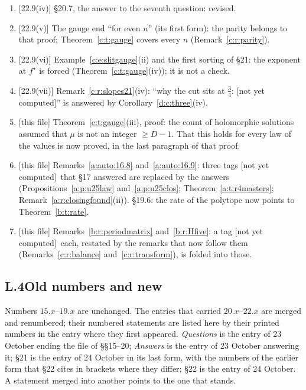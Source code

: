\documentclass[11pt]{article}
\theoremstyle{plain}
\theoremstyle{definition}
\theoremstyle{remark}
\newcommand{\notyet}{\textup{[not yet computed]}}
\begin{document}
\begin{enumerate}[label=\textbf{C\arabic*},ref=C\arabic*,leftmargin=*,itemsep=3pt]
\item {\small[22.9(iv)]} \S20.7, the answer to the seventh question: revised.
\item {\small[22.9(v)]} The gauge end ``for even $n$'' (its first form): the parity belongs to that proof; Theorem~\ref{c:t:gauge} covers every $n$ (Remark~\ref{c:r:parity}).
\item {\small[22.9(vi)]} Example~\ref{c:e:slitgauge}(ii) and the first sorting of \S21: the exponent at $f^\star$ is forced (Theorem~\ref{c:t:gauge}(iv)); it is not a check.
\item {\small[22.9(vii)]} Remark~\ref{c:r:slopes21}(iv): ``why the cut sits at $\frac34$: \notyet'' is answered by Corollary~\ref{d:c:three}(iv).
\item {\small[this file]} Theorem~\ref{c:t:gauge}(iii), proof: the count of holomorphic solutions assumed that $\mu$ is not an integer $\ge D-1$. That this holds for every law of the values is now proved, in the last paragraph of that proof.
\item {\small[this file]} Remarks~\ref{a:auto:16.8} and~\ref{a:auto:16.9}: three tags \notyet\ that \S17 answered are replaced by the answers (Propositions~\ref{a:p:u25law} and~\ref{a:p:u25clos}; Theorem~\ref{a:t:r4masters}; Remark~\ref{a:r:closingfound}(ii)). \S19.6: the rate of the polytope now points to Theorem~\ref{b:t:rate}.
\item {\small[this file]} Remarks~\ref{b:r:periodmatrix} and~\ref{b:r:Hfive}: a tag \notyet\ each, restated by the remarks that now follow them (Remarks~\ref{c:r:balance} and~\ref{c:r:transform}), is folded into those.
\end{enumerate}

\subsection*{L.4\quad Old numbers and new}

Numbers $15.x$--$19.x$ are unchanged. The entries that carried $20.x$--$22.x$ are merged and renumbered; their numbered statements are listed here by their printed numbers in the entry where they first appeared. \emph{Questions} is the entry of 23 October ending the file of \S\S15--20; \emph{Answers} is the entry of 23 October answering it; \S21 is the entry of 24 October in its last form, with the numbers of the earlier form that \S22 cites in brackets where they differ; \S22 is the entry of 24 October. A statement merged into another points to the one that stands.
\end{document}
